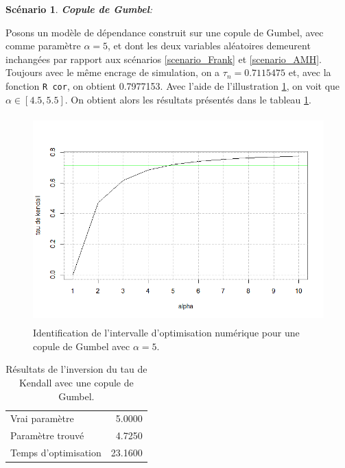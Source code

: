 \documentclass{article}
\newtheorem{scenario}{Scénario}
\begin{document}
 	\begin{scenario}
 		\textbf{Copule de Gumbel}:
 		\label{scenario_Gumbel}
 	\end{scenario}
	Posons un modèle de dépendance construit sur une copule de Gumbel, avec comme paramètre $\alpha = 5$, et dont les deux variables aléatoires demeurent inchangées par rapport aux scénarios \ref{scenario_Frank} et \ref{scenario_AMH}. Toujours avec le même encrage de simulation, on a $\tau_n = 0.7115475$ et, avec la fonction \texttt{R cor}, on obtient 0.7977153. Avec l'aide de l'illustration \ref{graph_intervalle_Gumbel}, on voit que $\alpha \in [4.5, 5.5]$. On obtient alors les résultats présentés dans le tableau \ref{tbl_Resultats_Gumbel}.
	
	\begin{figure}[H]
		\centering
		\includegraphics[height=8cm]{Graph/intevalle_Gumbel.png}
		\caption[Identification de l'intervalle d'optimisation numérique pour le scénario \ref{scenario_Gumbel}]
		{Identification de l'intervalle d'optimisation numérique pour une copule de Gumbel avec $\alpha = 5$.} 
		\label{graph_intervalle_Gumbel}
	\end{figure}
	
	\begin{table}[H]
		\centering
		\begin{tabular}{lr}
			\hline
			Vrai paramètre & 5.0000 \\ 
			Paramètre trouvé & 4.7250 \\ 
			Temps d'optimisation & 23.1600 \\ 
			\hline 
		\end{tabular}
		\caption{Résultats de l'inversion du tau de Kendall avec une copule de Gumbel.}
		\label{tbl_Resultats_Gumbel}
	\end{table}
\end{document}
